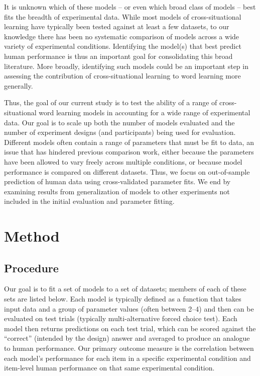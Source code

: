 \documentclass[10pt, letterpaper]{article}
\begin{document}
It is unknown which of these models -- or even which broad class of
models -- best fits the breadth of experimental data. While most models
of cross-situational learning have typically been tested against at
least a few datasets, to our knowledge there has been no systematic
comparison of models across a wide variety of experimental conditions.
Identifying the model(s) that best predict human performance is thus an
important goal for consolidating this broad literature. More broadly,
identifying such models could be an important step in assessing the
contribution of cross-situational learning to word learning more
generally.

Thus, the goal of our current study is to test the ability of a range of
cross-situational word learning models in accounting for a wide range of
experimental data. Our goal is to scale up both the number of models
evaluated and the number of experiment designs (and participants) being
used for evaluation. Different models often contain a range of
parameters that must be fit to data, an issue that has hindered previous
comparison work, either because the parameters have been allowed to vary
freely across multiple conditions, or because model performance is
compared on different datasets. Thus, we focus on out-of-sample
prediction of human data using cross-validated parameter fits. We end by
examining results from generalization of models to other experiments not
included in the initial evaluation and parameter fitting.

\hypertarget{method}{%
\section{Method}\label{method}}

\hypertarget{procedure}{%
\subsection{Procedure}\label{procedure}}

Our goal is to fit a set of models to a set of datasets; members of each
of these sets are listed below. Each model is typically defined as a
function that takes input data and a group of parameter values (often
between 2--4) and then can be evaluated on test trials (typically
multi-alternative forced choice test). Each model then returns
predictions on each test trial, which can be scored against the
``correct'' (intended by the design) answer and averaged to produce an
analogue to human performance. Our primary outcome measure is the
correlation between each model's performance for each item in a specific
experimental condition and item-level human performance on that same
experimental condition.
\end{document}

